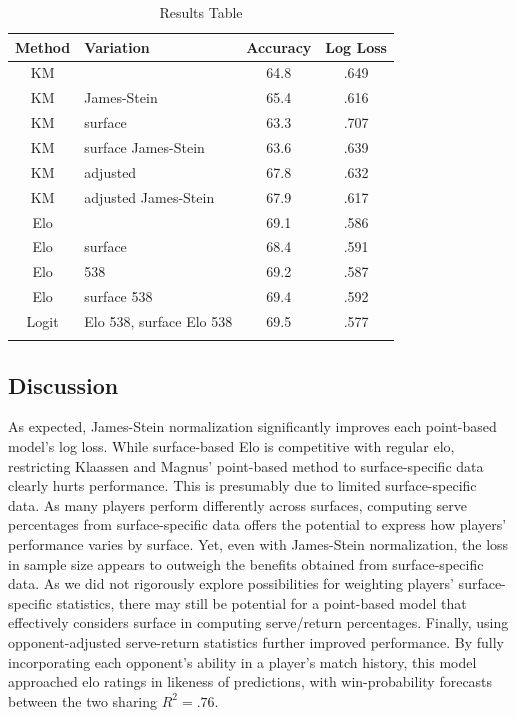 \documentclass[chapterprefix=false]{report}
\begin{document}
\begin{center}
\begin{table}[H]
        \caption{Results Table}
        \centering
        \begin{tabular}{@{}clcc@{}}
            \toprule
            Method & Variation & Accuracy & Log Loss \\\midrule

            KM & & 64.8 & .649  \\\addlinespace
            
            KM & James-Stein & 65.4 & .616
  \\\addlinespace
 KM & surface & 63.3 & .707
  \\\addlinespace
 KM & surface James-Stein & 63.6 & .639 \\\addlinespace
 KM & adjusted & 67.8 & .632 \\\addlinespace
 KM & adjusted James-Stein & 67.9 & .617 \\\addlinespace
 Elo &  & 69.1 & .586 \\\addlinespace
 Elo & surface & 68.4 & .591 \\\addlinespace
 Elo & 538 & 69.2 & .587 \\\addlinespace
 Elo & surface 538 & 69.4 & .592 \\\addlinespace
 Logit & Elo 538, surface Elo 538 & 69.5 & .577 \\\addlinespace
            \bottomrule
        \end{tabular}
    \end{table}
    \end{center}

\subsection{Discussion}

As expected, James-Stein normalization significantly improves each point-based model's log loss. While surface-based Elo is competitive with regular elo, restricting Klaassen and Magnus' point-based method to surface-specific data clearly hurts performance. This is presumably due to limited surface-specific data. As many players perform differently across surfaces, computing serve percentages from surface-specific data offers the potential to express how players' performance varies by surface. Yet, even with James-Stein normalization, the loss in sample size appears to outweigh the benefits obtained from surface-specific data. As we did not rigorously explore possibilities for weighting players' surface-specific statistics, there may still be potential for a point-based model that effectively considers surface in computing serve/return percentages. Finally, using opponent-adjusted serve-return statistics further improved performance. By fully incorporating each opponent's ability in a player's match history, this model approached elo ratings in likeness of predictions, with win-probability forecasts between the two sharing $R^2=.76$.
\end{document}
